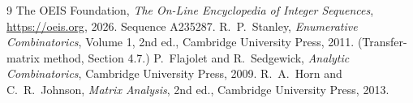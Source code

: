 \documentclass[11pt,a4paper]{article}
\theoremstyle{plain}
\theoremstyle{definition}
\begin{document}
\begin{thebibliography}{9}
 The OEIS Foundation, \emph{The On-Line Encyclopedia of Integer
Sequences}, \url{https://oeis.org}, 2026. Sequence A235287.
 R.~P.~Stanley, \emph{Enumerative Combinatorics}, Volume 1, 2nd ed.,
Cambridge University Press, 2011. (Transfer-matrix method, Section 4.7.)
 P.~Flajolet and R.~Sedgewick, \emph{Analytic Combinatorics}, Cambridge
University Press, 2009.
 R.~A.~Horn and C.~R.~Johnson, \emph{Matrix Analysis}, 2nd ed., Cambridge
University Press, 2013.
\end{thebibliography}
\end{document}
